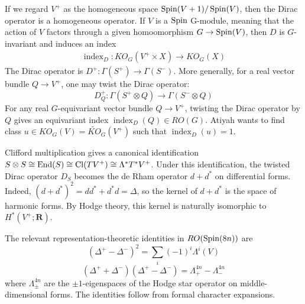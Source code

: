 \documentclass[12pt]{article}
\begin{document}
If we regard $V^+$ as the homogeneous space $\operatorname{Spin}(V+1)/\operatorname{Spin}(V)$, then the Dirac operator is a homogeneous operator. If $V$ is a $\operatorname{Spin}$ G-module, meaning that the action of $V$ factors through a given homoomorphism $G\to \operatorname{Spin}(V)$, then $D$ is $G$-invariant and induces an index \begin{align*}
    \operatorname{index}_D:KO_G(V^+\times X) \longrightarrow KO_G(X)
\end{align*}
The Dirac operator is $D^+:\Gamma(S^+)\longrightarrow \Gamma(S^-)$. More generally, for a real vector bundle $Q\to V^+$, one may twist the Dirac operator:
\[
D_Q^+:
\Gamma(S^+\otimes Q)
\longrightarrow
\Gamma(S^-\otimes Q)\]
For any real $G$-equivariant vector bundle $Q\to V^+$, twisting the Dirac
operator by $Q$ gives an equivariant index
$\operatorname{index}_D(Q)\in RO(G)$. Atiyah wants to find class
$u\in KO_G(V)=\widetilde{KO}_G(V^+)$ such that
$\operatorname{index}_D(u)=1$.

Clifford multiplication gives a canonical identification
$S\otimes S\cong\operatorname{End}(S)\cong\operatorname{Cl}(TV^+)\cong\Lambda^*T^*V^+$.
Under this identification, the twisted Dirac operator $D_S$ becomes the de
Rham operator $d+d^*$ on differential forms. Indeed,
$(d+d^*)^2=dd^*+d^*d=\Delta$, so the kernel of $d+d^*$ is the space of
harmonic forms. By Hodge theory, this kernel is naturally isomorphic to
$H^*(V^+;\mathbf R)$.

The relevant representation-theoretic identities in $RO(\operatorname{Spin}(8n))$ are
\[(\Delta^+-\Delta^-)^2=\sum_i(-1)^i\Lambda^i(V)\]
\[(\Delta^++\Delta^-)(\Delta^+-\Delta^-)=\Lambda^{4n}_+-\Lambda^{4n}_-\]
where $\Lambda^{4n}_\pm$ are the $\pm1$-eigenspaces of the Hodge star operator
on middle-dimensional forms. The identities follow from formal character expansions.
\end{document}
